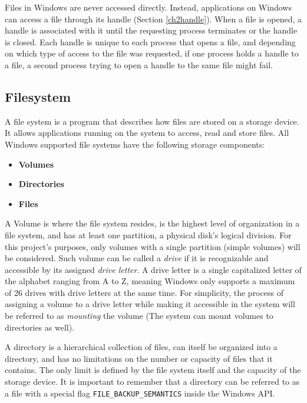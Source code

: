 Files in Windows are never accessed directly. Instead, applications on Windows can access a file through its handle (Section \ref{ch2handle}). When a file is opened, a handle is associated with it until the requesting process terminates or the handle is closed. Each handle is unique to each process that opens a file, and depending on which type of access to the file was requested, if one process holds a handle to a file, a second process trying to open a handle to the same file might fail.\cite{FileHandles}

\subsection{Filesystem}
A file system is a program that describes how files are stored on a storage device. It allows applications running on the system to access, read and store files. All Windows supported file systems have the following storage components:\cite{LocalFileSystems}

\begin{itemize}
    \item \textbf{Volumes}
    \item \textbf{Directories}
    \item \textbf{Files}
\end{itemize}

A Volume is where the file system resides, is the highest level of organization in a file system, and has at least one partition, a physical disk's logical division.\cite{WinVolumeMgmt} For this project's purposes, only volumes with a single partition (simple volumes) will be considered. Such volume can be called a \textit{drive} if it is recognizable and accessible by its assigned \textit{drive letter}. 
A drive letter is a single capitalized letter of the alphabet ranging from A to Z, meaning Windows only supports a maximum of 26 drives with drive letters at the same time. For simplicity, the process of assigning a volume to a drive letter while making it accessible in the system will be referred to as \textit{mounting} the volume (The system can mount volumes to directories as well).

A directory is a hierarchical collection of files, can itself be organized into a directory, and has no limitations on the number or capacity of files that it contains. The only limit is defined by the file system itself and the capacity of the storage device.\cite{WinDirectoryMgmt} It is important to remember that a directory can be referred to as a file with a special flag \lstinline{FILE_BACKUP_SEMANTICS} inside the Windows API.

